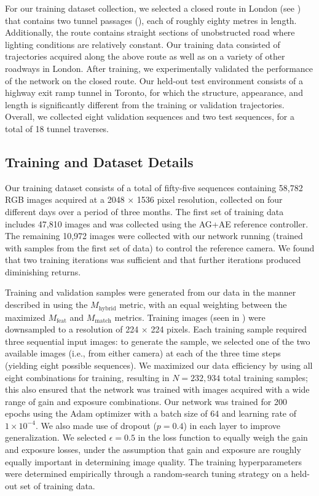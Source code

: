 \documentclass[letterpaper, 10pt, journal, twoside]{IEEEtran}
\begin{document}
For our training dataset collection, we selected a closed route in London (see ) that contains two tunnel passages (), each of roughly eighty metres in length. 
Additionally, the route contains straight sections of unobstructed road where lighting conditions are relatively constant. 
Our training data consisted of trajectories acquired along the above route as well as on a variety of other roadways in London.
After training, we experimentally validated the performance of the network on the closed route. Our held-out test environment consists of a highway exit ramp tunnel in Toronto, for which the structure, appearance, and length is significantly different from the training or validation trajectories. Overall, we collected eight validation sequences and two test sequences, for a total of 18 tunnel traverses.

\subsection{Training and Dataset Details}

Our training dataset consists of a total of fifty-five sequences containing 58,782 RGB images acquired at a 2048 $\times$ 1536 pixel resolution, collected on four different days over a period of three months.
The first set of training data includes 47,810 images and was collected using the AG+AE reference controller.
The remaining 10,972 images were collected with our network running (trained with samples from the first set of data) to control the reference camera.
We found that two training iterations was sufficient and that further iterations produced diminishing returns.

Training and validation samples were generated from our data in the manner described in  using the $M_{\text{hybrid}}$ metric, with an equal weighting between the maximized $M_{\text{feat}}$ and $M_{\text{match}}$ metrics.
Training images (seen in ) were downsampled to a resolution of 224 $\times$ 224 pixels. Each training sample required three sequential input images: to generate the sample, we selected one of the two available images (i.e., from either camera) at each of the three time steps (yielding eight possible sequences). We maximized our data efficiency by using all eight combinations for training, resulting in $N = 232,934$ total training samples; this also ensured that the network was trained with images acquired with a wide range of gain and exposure combinations.
Our network was trained for 200 epochs using the Adam optimizer \cite{Kingma2015} with a batch size of 64 and learning rate of $1 \times 10^{-4}$. 
We also made use of dropout \cite{Srivastava2014} ($p=0.4$) in each layer to improve generalization.
We selected $\epsilon = 0.5$ in the loss function to equally weigh the gain and exposure losses, under the assumption that gain and exposure are roughly equally important in determining image quality.
The training hyperparameters were determined empirically through a random-search tuning strategy on a held-out set of training data. 
\end{document}
